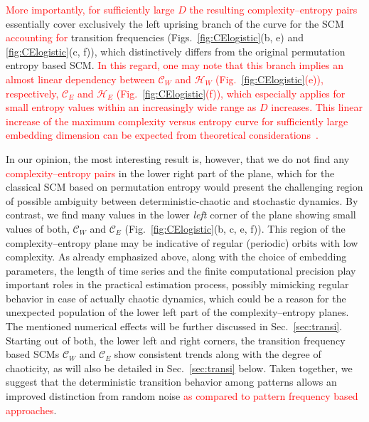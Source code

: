 \documentclass[aip,cha,reprint,nofootinbib]{revtex4-1}
\begin{document}
\textcolor{red}{More importantly, for sufficiently large $D$ the resulting complexity--entropy pairs} essentially cover exclusively the left uprising branch of the curve for the SCM \textcolor{red}{accounting for} transition frequencies (Figs.~\ref{fig:CElogistic}(b, e) and \ref{fig:CElogistic}(c, f)), which distinctively differs from the original permutation entropy based SCM. \textcolor{red}{In this regard, one may note that this branch implies an almost linear dependency between $\mathcal{C}_W$ and $\mathcal{H}_{W}$ (Fig.~\ref{fig:CElogistic}(e)), respectively, $\mathcal{C}_{E}$ and $\mathcal{H}_{E}$ (Fig.~\ref{fig:CElogistic}(f)), which especially applies for small entropy values within an increasingly wide range as $D$ increases. This linear increase of the maximum complexity versus entropy curve for sufficiently large embedding dimension can be expected from theoretical considerations~\cite{SMCbook2010}.}

In our opinion, the most interesting result is, however, that we do not find any \textcolor{red}{complexity--entropy pairs} in the lower right part of the plane, which for the classical SCM based on permutation entropy would present the challenging region of possible ambiguity between deterministic-chaotic and stochastic dynamics. {\color{red}By contrast, we find many values in the lower \emph{left} corner of the plane showing small values of both, $\mathcal{C}_{W}$ and $\mathcal{C}_{E}$ (Fig.~\ref{fig:CElogistic}(b, c, e, f)). This region of the complexity--entropy plane may be indicative of regular (periodic) orbits with low complexity. As already emphasized above, along with the choice of embedding parameters, the length of time series and the finite computational precision play important roles in the practical estimation process, possibly mimicking regular behavior in case of actually chaotic dynamics, which could be a reason for the unexpected population of the lower left part of the complexity--entropy planes. The mentioned numerical effects will be further discussed in Sec.~\ref{sec:transi}. Starting out of both, the lower left and right corners, the transition frequency based SCMs $\mathcal{C}_{W}$ and $\mathcal{C}_{E}$ show consistent trends along with the degree of chaoticity, as will also be detailed in Sec.~\ref{sec:transi} below. Taken together,} we suggest that the deterministic transition behavior among patterns allows an improved distinction from random noise \textcolor{red}{as compared to pattern frequency based approaches}. 
\end{document}
